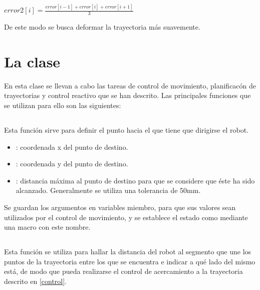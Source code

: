 \begin{center}
$error2[i] = \frac{error[i-1] + error[i] + error[i+1]}{3}$
\end{center}

\noindent
De este modo se busca deformar la trayectoria más suavemente.

\section{La clase }
En esta clase se llevan a cabo las tareas de control de movimiento, planificacón de trayectorias y control reactivo que se han descrito. Las principales funciones que se utilizan para ello son las siguientes:

\subsection{}

\noindent
{}

\noindent
Esta función sirve para definir el punto hacia el que tiene que dirigirse el robot.

\begin{itemize}
  \item {}: coordenada x del punto de destino.
  \item {}: coordenada y del punto de destino.
  \item {}: distancia máxima al punto de destino para que se considere que éste ha sido alcanzado. Generalmente se utiliza una tolerancia de 50mm.
\end{itemize}

\noindent
Se guardan los argumentos en variables miembro, para que sus valores sean utilizados por el control de movimiento, y se establece el estado como  mediante una macro con este nombre.

\subsection{}

\noindent
{}

\noindent
Esta función se utiliza para hallar la distancia del robot al segmento que une los puntos de la trayectoria entre los que se encuentra e indicar a qué lado del mismo está, de modo que pueda realizarse el control de acercamiento a la trayectoria descrito en \ref{control}.

